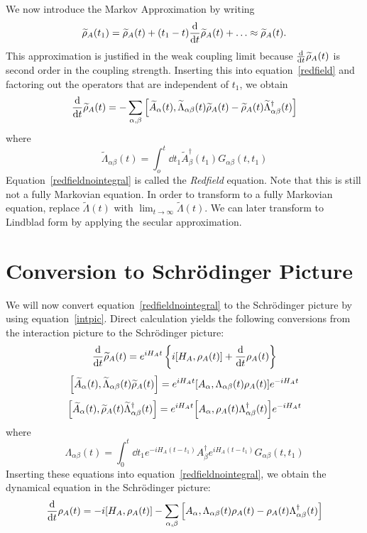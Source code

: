 \documentclass{article}
\newcommand{\til}[1]{\widetilde{#1}}
\begin{document}
We now introduce the Markov Approximation by writing
\begin{equation}\label{markov}
\til{\rho}_A(t_1) = \til{\rho}_A(t) + (t_1-t)\dv{t}\til{\rho}_A(t)+\ldots \approx \til{\rho}_A(t).
\end{equation}
This approximation is justified in the weak coupling limit because $\dv{t}\til{\rho}_A(t)$ is second order in the coupling strength. Inserting this into equation~\ref{redfield} and factoring out the operators that are independent of $t_1$, we obtain
\begin{equation}\label{redfieldnointegral}
\dv{t}\til{\rho}_A(t) = -\sum_{\alpha,\beta}\comm{\til{A}_{\alpha}(t)}{\til{\Lambda}_{\alpha\beta}(t)\til{\rho}_A(t) - \til{\rho}_A(t)\til{\Lambda}_{\alpha\beta}^{\dag}(t)}
\end{equation}
where
\begin{equation}\label{Lambdaint}
\til{\Lambda}_{\alpha\beta}(t) = \int_o^t\dd{t_1} \til{A}_{\beta}^{\dag}(t_1)G_{\alpha\beta}(t,t_1)
\end{equation}
Equation~\ref{redfieldnointegral} is called the \textit{Redfield} equation. Note that this is still not a fully Markovian equation. In order to transform to a fully Markovian equation, replace $\til{\Lambda}(t)$ with $\lim_{t\to\infty}\til{\Lambda}(t)$. We can later transform to Lindblad form by applying the secular approximation.

\section{Conversion to Schr{\"o}dinger Picture}

We will now convert equation~\ref{redfieldnointegral} to the Schr{\"o}dinger picture by using equation~\ref{intpic}. Direct calculation yields the following conversions from the interaction picture to the Schr{\"o}dinger picture:
\begin{equation}\label{p1}
\dv{t}\til{\rho}_A(t) = e^{iH_At}\left\{i\comm{H_A}{\rho_A(t)}+\dv{t}\rho_A(t)\right\}
\end{equation}
\begin{equation}\label{p2}
\comm{\til{A}_{\alpha}(t)}{\til{\Lambda}_{\alpha\beta}(t)\til{\rho}_A(t)} = e^{iH_At}\comm{A_{\alpha}}{\Lambda_{\alpha\beta}(t)\rho_A(t)}e^{-iH_At}
\end{equation}
\begin{equation}\label{p3}
\comm{\til{A}_{\alpha}(t)}{\til{\rho}_A(t)\til{\Lambda}_{\alpha\beta}^{\dag}(t)} = e^{iH_At}\comm{A_{\alpha}}{\rho_A(t)\Lambda_{\alpha\beta}^{\dag}(t)}e^{-iH_At}
\end{equation}
where
\begin{equation}\label{Lambdasch}
\Lambda_{\alpha\beta}(t) = \int_0^t\dd{t_1} e^{-iH_A(t-t_1)}A_{\beta}^{\dag}e^{iH_A(t-t_1)}G_{\alpha\beta}(t,t_1)
\end{equation}
Inserting these equations into equation~\ref{redfieldnointegral}, we obtain the dynamical equation in the Schr{\"o}dinger picture:
\begin{equation}\label{yas}
\dv{t}\rho_A(t) = -i\comm{H_A}{\rho_A(t)}-\sum_{\alpha,\beta}\comm{A_{\alpha}}{\Lambda_{\alpha\beta}(t)\rho_A(t)-\rho_A(t)\Lambda_{\alpha\beta}^{\dag}(t)}
\end{equation}
\end{document}
